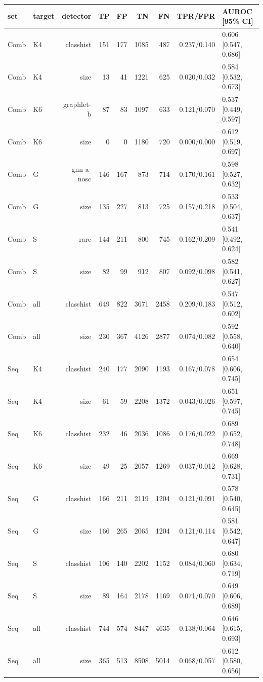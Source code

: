 \begin{tabular}{@{}llrrrrrrl@{}}
\toprule
set & target & detector & TP & FP & TN & FN & TPR/FPR & AUROC [95\% CI]  \\
\midrule
Comb & K4 & classhist & 151 & 177 & 1085 & 487 & 0.237/0.140 & 0.606 [0.547, 0.686] \\
Comb & K4 & size & 13 & 41 & 1221 & 625 & 0.020/0.032 & 0.584 [0.532, 0.673] \\
Comb & K6 & graphlet-b & 87 & 83 & 1097 & 633 & 0.121/0.070 & 0.537 [0.449, 0.597] \\
Comb & K6 & size & 0 & 0 & 1180 & 720 & 0.000/0.000 & 0.612 [0.519, 0.697] \\
Comb & G & gnn-a-nosc & 146 & 167 & 873 & 714 & 0.170/0.161 & 0.598 [0.527, 0.632] \\
Comb & G & size & 135 & 227 & 813 & 725 & 0.157/0.218 & 0.533 [0.504, 0.637] \\
Comb & S & rare & 144 & 211 & 800 & 745 & 0.162/0.209 & 0.541 [0.492, 0.624] \\
Comb & S & size & 82 & 99 & 912 & 807 & 0.092/0.098 & 0.582 [0.541, 0.627] \\
Comb & all & classhist & 649 & 822 & 3671 & 2458 & 0.209/0.183 & 0.547 [0.512, 0.602] \\
Comb & all & size & 230 & 367 & 4126 & 2877 & 0.074/0.082 & 0.592 [0.558, 0.640] \\
\midrule
Seq & K4 & classhist & 240 & 177 & 2090 & 1193 & 0.167/0.078 & 0.654 [0.606, 0.745] \\
Seq & K4 & size & 61 & 59 & 2208 & 1372 & 0.043/0.026 & 0.651 [0.597, 0.745] \\
Seq & K6 & classhist & 232 & 46 & 2036 & 1086 & 0.176/0.022 & 0.689 [0.652, 0.748] \\
Seq & K6 & size & 49 & 25 & 2057 & 1269 & 0.037/0.012 & 0.669 [0.628, 0.731] \\
Seq & G & classhist & 166 & 211 & 2119 & 1204 & 0.121/0.091 & 0.578 [0.540, 0.645] \\
Seq & G & size & 166 & 265 & 2065 & 1204 & 0.121/0.114 & 0.581 [0.542, 0.647] \\
Seq & S & classhist & 106 & 140 & 2202 & 1152 & 0.084/0.060 & 0.680 [0.634, 0.719] \\
Seq & S & size & 89 & 164 & 2178 & 1169 & 0.071/0.070 & 0.649 [0.606, 0.689] \\
Seq & all & classhist & 744 & 574 & 8447 & 4635 & 0.138/0.064 & 0.646 [0.615, 0.693] \\
Seq & all & size & 365 & 513 & 8508 & 5014 & 0.068/0.057 & 0.612 [0.580, 0.656] \\

\end{tabular}
